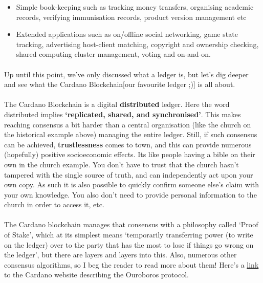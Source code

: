 \documentclass[a4paper, 11pt]{article}
\begin{document}
\begin{description}
        \begin{itemize}
            \item Simple book-keeping such as tracking money transfers, organising academic records, verifying immunisation records, product version management etc 
            \item Extended applications such as on/offline social networking, game state tracking, advertising host-client matching, copyright and ownership checking, shared computing cluster management, voting and on-and-on.
        \end{itemize}

        \paragraph{}Up until this point, we've only discussed what a ledger is, but let's dig deeper and see what the Cardano Blockchain[our favourite ledger ;)] is all about. 

        \paragraph{}The Cardano Blockchain is a digital \textbf{distributed} ledger. Here the word distributed implies \textbf{`replicated, shared, and synchronised'}. This makes reaching consensus a bit harder than a central organisation (like the church on the historical example above) managing the entire ledger. Still, if such consensus can be achieved, \textbf{trustlessness} comes to town, and this can provide numerous (hopefully) positive socioeconomic effects. Its like people having a bible on their own in the church example. You don't have to trust that the church hasn't tampered with the single source of truth, and can independently act upon your own copy. As such it is also possible to quickly confirm someone else's claim with your own knowledge. You also don't need to provide personal information to the church in order to access it, etc.
        
        \paragraph{}The Cardano blockchain manages that consensus with a philosophy called `Proof of Stake', which at its simplest means `temporarily transferring power (to write on the ledger) over to the party that has the most to lose if things go wrong on the ledger', but there are layers and layers into this. Also, numerous other consensus algorithms, so I beg the reader to read more about them! Here's a \href{https://cardano.org/ouroboros/}{link} to the Cardano website describing the Ouroboros protocol.


\end{description}
\end{document}
